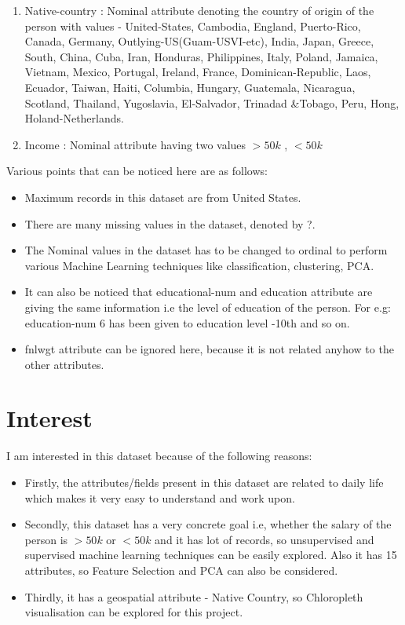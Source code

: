 \documentclass{article}
\begin{document}
\begin{enumerate}
   \item Native-country : Nominal attribute denoting the country of origin of the person with values -  United-States, Cambodia, England, Puerto-Rico, Canada, Germany, Outlying-US(Guam-USVI-etc), India, Japan, Greece, South, China, Cuba, Iran, Honduras,    Philippines, Italy, Poland, Jamaica, Vietnam, Mexico, Portugal, Ireland, France, Dominican-Republic, Laos, Ecuador, Taiwan, Haiti, Columbia, Hungary, Guatemala, Nicaragua, Scotland, Thailand, Yugoslavia, El-Salvador, Trinadad \&Tobago, Peru,
  Hong, Holand-Netherlands. 
   \item Income : Nominal attribute having two values $>50k$ , $<50k$
\end{enumerate}

\noindent Various points that can be noticed here are as follows:
\begin{itemize}
\item Maximum records in this dataset are from United States.
\item There are many missing values in the dataset, denoted by ?. 
\item The Nominal values in the dataset has to be changed to ordinal to perform various Machine Learning techniques like classification, clustering, PCA.
\item It can also be noticed that educational-num and education attribute are giving the same information i.e the level of education of the person. For e.g: education-num 6 has been given to education level -10th and so on.
\item fnlwgt attribute can be ignored here, because it is not related anyhow to the other attributes.
\end{itemize}

\section*{Interest}  

I am interested in this dataset because of the following reasons:
\begin{itemize}
\item Firstly, the attributes/fields present in this dataset are related to daily life which makes it very easy to understand and work upon.
\item Secondly, this dataset has a very concrete goal i.e, whether the salary of the person is $>50k$ or $<50k$ and it has lot of records, so unsupervised and supervised machine learning techniques can be easily explored. Also it has 15 attributes, so Feature Selection and PCA can also be considered.
\item Thirdly, it has a geospatial attribute - Native Country, so Chloropleth visualisation can be explored for this project.
\end{itemize}
\end{document}
